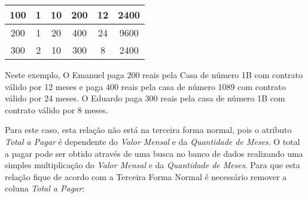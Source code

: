 \begin{table}[h]
\begin{tabular}{|c|c|c|c|c|c|}
            100                                                                                                    & 1                                                                                                & 10                                                                                             & 200                                                    & 12                                                            & 2400                                                    \\ \hline
            200                                                                                                    & 1                                                                                                & 20                                                                                             & 400                                                    & 24                                                            & 9600                                                    \\ \hline
            300                                                                                                    & 2                                                                                                & 10                                                                                             & 300                                                    & 8                                                             & 2400                                                    \\ \hline
        \end{tabular}
    \end{table}
    
Neste exemplo, O Emanuel paga 200 reais pela Casa de número 1B com contrato válido por 12 meses e paga 400 reais pela casa de número 1089 com contrato válido por 24 meses. O Eduardo paga 300 reais pela casa de número 1B com contrato válido por 8 meses.
    
Para este caso, esta relação não está na terceira forma normal, pois o atributo \textit{Total a Pagar} é dependente do \textit{Valor Mensal} e da \textit{Quantidade de Meses}. O total a pagar pode ser obtido através de uma busca no banco de dados realizando uma simples multiplicação do \textit{Valor Mensal} e da \textit{Quantidade de Meses}. Para que esta relação fique de acordo com a Terceira Forma Normal é necessário remover a coluna \textit{Total a Pagar}:
    
